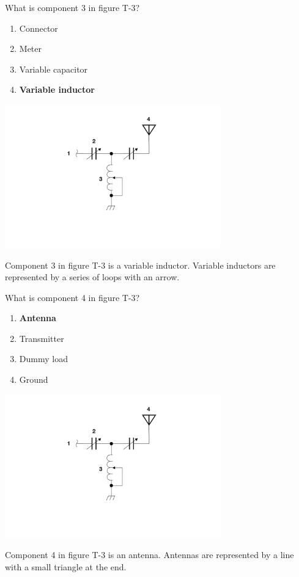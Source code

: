 \begin{tcolorbox}[
    colback=gray!10!white,
    colframe=black!75!black,
    title={T6C10},
    sidebyside,
    sidebyside align=top,
    lefthand width=0.45\textwidth
]
What is component 3 in figure T-3?
\begin{enumerate}[label=\Alph*),noitemsep]
    \item Connector
    \item Meter
    \item Variable capacitor
    \item \textbf{Variable inductor}
\end{enumerate}
\tcblower
\includegraphics[width=0.7\textwidth]{tech/images/t3.png}
\end{tcolorbox}
Component 3 in figure T-3 is a variable inductor. Variable inductors are represented by a series of loops with an arrow.

\begin{tcolorbox}[
    colback=gray!10!white,
    colframe=black!75!black,
    title={T6C11},
    sidebyside,
    sidebyside align=top,
    lefthand width=0.45\textwidth
]
What is component 4 in figure T-3?
\begin{enumerate}[label=\Alph*),noitemsep]
    \item \textbf{Antenna}
    \item Transmitter
    \item Dummy load
    \item Ground
\end{enumerate}
\tcblower
\includegraphics[width=0.7\textwidth]{tech/images/t3.png}
\end{tcolorbox}
Component 4 in figure T-3 is an antenna. Antennas are represented by a line with a small triangle at the end.


